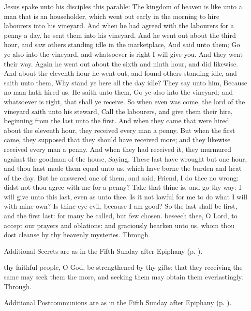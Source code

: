  Jesus spake unto his disciples this parable: The kingdom of heaven is like unto a man that is an householder, which went out early in the morning to hire labourers into his vineyard. And when he had agreed with the labourers for a penny a day, he sent them into his vineyard. And he went out about the third hour, and saw others standing idle in the marketplace, And said unto them; Go ye also into the vineyard, and whatsoever is right I will give you. And they went their way. Again he went out about the sixth and ninth hour, and did likewise. And about the eleventh hour he went out, and found others standing idle, and saith unto them, Why stand ye here all the day idle? They say unto him, Because no man hath hired us. He saith unto them, Go ye also into the vineyard; and whatsoever is right, that shall ye receive. So when even was come, the lord of the vineyard saith unto his steward, Call the labourers, and give them their hire, beginning from the last unto the first. And when they came that were hired about the eleventh hour, they received every man a penny. But when the first came, they supposed that they should have received more; and they likewise received every man a penny. And when they had received it, they murmured against the goodman of the house, Saying, These last have wrought but one hour, and thou hast made them equal unto us, which have borne the burden and heat of the day. But he answered one of them, and said, Friend, I do thee no wrong: didst not thou agree with me for a penny? Take that thine is, and go thy way: I will give unto this last, even as unto thee. Is it not lawful for me to do what I will with mine own? Is thine eye evil, because I am good? So the last shall be first, and the first last: for many be called, but few chosen.
\secret
{} beseech thee, O Lord, to accept our prayers and oblations: and graciously hearken unto us, whom thou dost cleanse by thy heavenly mysteries. Through.
\begin{rubric}
    Additional Secrets are as in the Fifth Sunday after Epiphany (p. \pageref{EpiphanyVSecret}).
\end{rubric}
\postcommunion
{} thy faithful people, O God, be strengthened by thy gifts: that they receiving the same may seek them the more, and seeking them may obtain them everlastingly. Through.
\begin{rubric}
    Additional Postcommunions are as in the Fifth Sunday after Epiphany (p. \pageref{EpiphanyVPostcommunion}).
\end{rubric}

